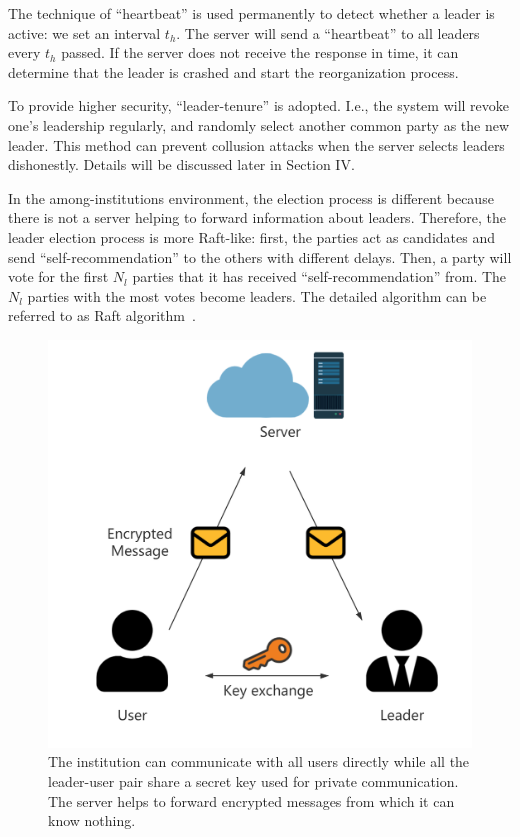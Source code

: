The technique of ``heartbeat'' is used permanently to detect whether a leader is active: we set an interval $t_h$. The server will send a ``heartbeat'' to all leaders every $t_h$ passed. If the server does not receive the response in time, it can determine that the leader is crashed and start the reorganization process.

To provide higher security, ``leader-tenure'' is adopted. I.e., the system will revoke one's leadership regularly, and randomly select another common party as the new leader. This method can prevent collusion attacks when the server selects leaders dishonestly. Details will be discussed later in Section IV. 

In the among-institutions environment, the election process is different because there is not a server helping to forward information about leaders. Therefore, the leader election process is more Raft-like: first, the parties act as candidates and send ``self-recommendation'' to the others with different delays. Then, a party will vote for the first $N_l$ parties that it has received ``self-recommendation'' from. The $N_l$ parties with the most votes become leaders. The detailed algorithm can be referred to as Raft algorithm~\cite{Raft}.

\begin{figure}[!ht]
    \centering
    \includegraphics[width=\columnwidth]{img/leader-user.png}
    \caption{The institution can communicate with all users directly while all the leader-user pair share a secret key used for private communication. The server helps to forward encrypted messages from which it can know nothing.}
    \label{leader-user}
\end{figure}

